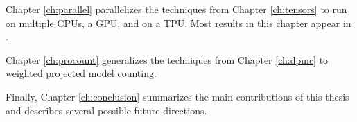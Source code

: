 Chapter \ref{ch:parallel} parallelizes the techniques from Chapter \ref{ch:tensors} to run on multiple CPUs, a GPU, and on a TPU. Most results in this chapter appear in \cite{dudek2020parallel}.

Chapter \ref{ch:procount} generalizes the techniques from Chapter \ref{ch:dpmc} to weighted projected model counting.

Finally, Chapter \ref{ch:conclusion} summarizes the main contributions of this thesis and describes several possible future directions.